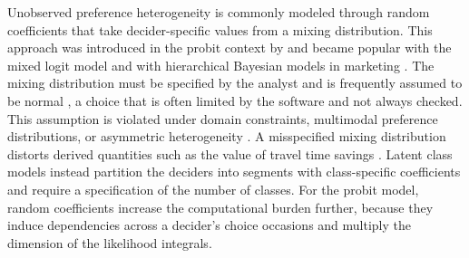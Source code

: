 \documentclass[article,shortnames]{jss}
\begin{document}
Unobserved preference heterogeneity is commonly modeled through random
coefficients that take decider-specific values from a mixing distribution. This
approach was introduced in the probit context by \citet{Hausman1978} and became
popular with the mixed logit model \citep{McFadden2000} and with hierarchical
Bayesian models in marketing \citep{Allenby1998}. The mixing distribution must
be specified by the analyst and is frequently assumed to be normal
\citep[Chapter~6]{Train2009}, a choice that is often limited by the software
and not always checked. This assumption is violated under domain constraints,
multimodal preference distributions, or asymmetric heterogeneity
\citep{Cirillo2006, Scarpa2008, Caputo2018}. A misspecified mixing distribution
distorts derived quantities such as the value of travel time savings
\citep{Hess2005, Fosgerau2006}. Latent class models instead partition
the deciders into segments with class-specific coefficients \citep{Kamakura1989,
Greene2003, Kim2023} and require a specification of the number of classes. For
the probit model, random coefficients increase the computational burden further,
because they induce dependencies across a decider's choice occasions and
multiply the dimension of the likelihood integrals.
\end{document}

